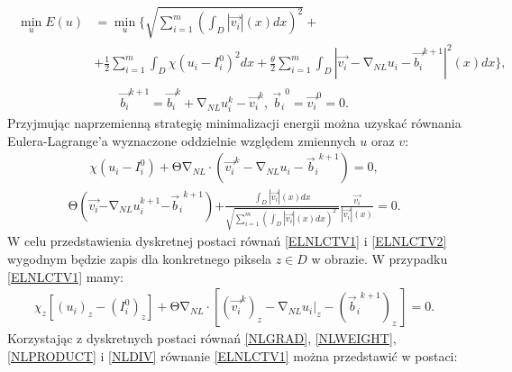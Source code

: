 \documentclass[a4paper,12pt,twoside,openany]{report}
\begin{document}
\begin{align}
\begin{aligned}
\mathop{\mathrm{min}}_{u}E\left(u\right) &= \mathop{\mathrm{min}}_{u}\Biggl\{\sqrt{\sum^m_{i=1}{{\left(\int_D{\left|\overrightarrow{v_i}\right|(x)}dx\right)}^2}}+\\ 
&+\frac{1}{2}\sum^m_{i=1}{\int_D{ \chi {\left(u_i-I^0_i\right)}^2}dx} 
+\frac{\theta }{2}\sum^m_{i=1}{\int_D{{\left|\overrightarrow{v_i}-{\mathrm{\nabla }}_{NL}u_i- {\overrightarrow{b_i}}^{k+1}\right|}^2\left(x\right)}dx}\Biggr\},
\end{aligned}
\label{ENLCTV1}
\end{align}
\begin{align}
{\overrightarrow{b_i}}^{k+1}={\overrightarrow{b_i}}^k+{\mathrm{\nabla }}_{NL}u^k_i-{\overrightarrow{v_i}}^k,\ {{\overrightarrow{b}}_i}^0={\overrightarrow{v_i}}^0=0.
\label{ENLCTV2}
\end{align}
Przyjmując naprzemienną strategię minimalizacji energii można uzyskać równania Eulera-Lagrange’a wyznaczone oddzielnie względem zmiennych $u$ oraz $v$:
\begin{align}
\chi \left(u_i-I^0_i\right)+\mathrm{\Theta }{\mathrm{\nabla }}_{NL}\cdot \left({\overrightarrow{v_i}}^k-{\mathrm{\nabla }}_{NL}u_i-{{\overrightarrow{b}}_i}^{k+1}\right)=0,
\label{ELNLCTV1}
\end{align}
\begin{align}
\mathrm{\Theta }\left(\overrightarrow{v_i}\mathrm{-}{\mathrm{\nabla }}_{NL}u^{k+1}_i\mathrm{-}{{\overrightarrow{b}}_i}^{k+1}\right)\mathrm{+}\frac{\int_D{\left|\overrightarrow{v_i}\right|(x)}dx}{\sqrt{\sum^m_{i=1}{{\left(\int_D{\left|\overrightarrow{v_i}\right|(x)}dx\right)}^2}\ }}\frac{\overrightarrow{v_i}}{\left|\overrightarrow{v_i}\right|(x)}\mathrm{=0}.
\label{ELNLCTV2}
\end{align}
W celu przedstawienia dyskretnej postaci równań \eqref{ELNLCTV1} i \eqref{ELNLCTV2} wygodnym będzie zapis dla konkretnego piksela $z\in D$ w obrazie. W przypadku \eqref{ELNLCTV1} mamy: 
\begin{align}
\chi_z \left[{(u_i)}_z-{\left(I^0_i\right)}_z \right]+\mathrm{\Theta}{\mathrm{\nabla}}_{NL}\cdot \left[ \left({{\overrightarrow{v_i}}^k}\right)_z-{{\mathrm{\nabla}}_{NL}u_i}\big|_z-{\left({{\overrightarrow{b}}_i}^{k+1}\right)}_z \ \right]=0 .
\label{DELNLCTV1}
\end{align}
Korzystając z dyskretnych postaci równań \eqref{NLGRAD}, \eqref{NLWEIGHT}, \eqref{NLPRODUCT} i \eqref{NLDIV} równanie \eqref{ELNLCTV1} można przedstawić w postaci:
\end{document}
